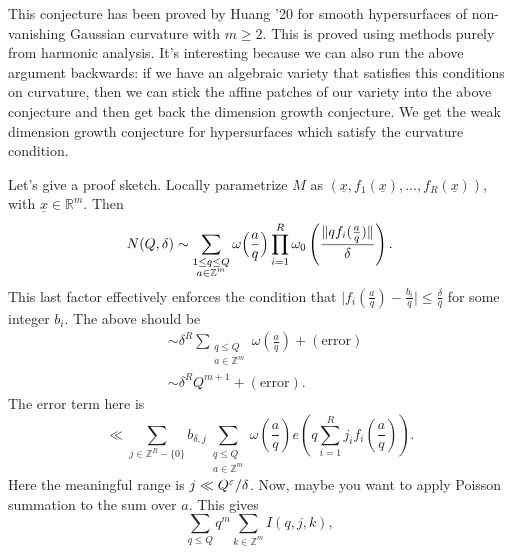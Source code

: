 \documentclass[reqno]{amsart} 
\numberwithin{theorem}{section}
\numberwithin{equation}{section}
\begin{document}
This conjecture has been proved by Huang '20 for smooth hypersurfaces of non-vanishing Gaussian curvature with $m \geq 2$.  This is proved using methods purely from harmonic analysis.  It's interesting because we can also run the above argument backwards: if we have an algebraic variety that satisfies this conditions on curvature, then we can stick the affine patches of our variety into the above conjecture and then get back the dimension growth conjecture.  We get the weak dimension growth conjecture for hypersurfaces which satisfy the curvature condition.

Let's give a proof sketch.  Locally parametrize $M$ as $(\underline{x}, f_1(\underline{x}), \dotsc, f_R(\underline{x}))$, with $\underline{x} \in \mathbb{R}^m$.  Then
\begin{equation*}
  N(Q, \delta) \sim \sum_{
    \substack{
      1 \leq q \leq Q  \\
      a \in \mathbb{Z}^m
    }
  }
  \omega\Bigl(\frac{a}{q}\Bigr)
  \prod_{i = 1}^R \omega_0 \left( \frac{\lVert q f_i(\frac{a}{q}) \rVert}{\delta} \right).
\end{equation*}
This last factor effectively enforces the condition that $\lvert f_i(\tfrac{a}{q}) - \frac{b_i}{q} \rvert \leq \frac{\delta}{q}$ for some integer $b_i$.  The above should be
\begin{align*}
  &\sim \delta^R \sum_{
                                                                         \substack{
                                                                         q \leq Q  \\
  a \in \mathbb{Z}^m
  }
  } \omega \left( \frac{a}{q} \right)
  +(\mathrm{error}) \\
                                                                      &\sim \delta^R Q^{m + 1} + (\mathrm{error}).
\end{align*}
The error term here is
\begin{equation*}
  \ll \sum_{j \in \mathbb{Z}^R - \{0\}}
  b_{\delta, j}
  \sum_{
    \substack{
      q \leq Q  \\
      a \in \mathbb{Z}^m
    }
  }
  \omega \left( \frac{a}{q} \right)
  e \left( q \sum_{i = 1}^R j_i f_i \left( \frac{a}{q} \right) \right).
\end{equation*}
Here the meaningful range is $j \ll Q^\varepsilon / \delta$.  Now, maybe you want to apply Poisson summation to the sum over $a$.  This gives
\begin{equation*}
  \sum_{q \leq Q} q^m \sum_{k \in \mathbb{Z}^m} I(q, j, k),
\end{equation*}
\end{document}
